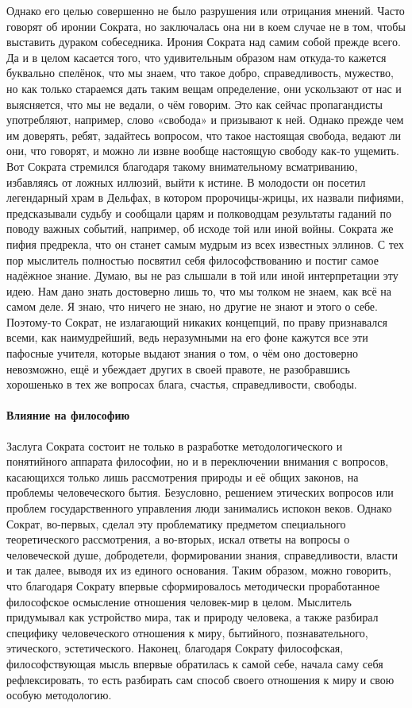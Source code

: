 Однако его целью совершенно не было разрушения или отрицания мнений. Часто говорят об иронии Сократа, но заключалась она ни в коем случае не в том, чтобы выставить дураком собеседника. Ирония Сократа над самим собой прежде всего. Да и в целом касается того, что удивительным образом нам откуда-то кажется буквально спелёнок, что мы знаем, что
такое добро, справедливость, мужество, но как только стараемся дать таким вещам
определение, они ускользают от нас и выясняется, что мы не ведали, о чём
говорим. Это как сейчас пропагандисты употребляют, например, слово «свобода» и
призывают к ней. Однако прежде чем им доверять, ребят, задайтесь вопросом, что
такое настоящая свобода, ведают ли они, что говорят, и можно ли извне вообще
настоящую свободу как-то ущемить. Вот Сократа стремился благодаря такому
внимательному всматриванию, избавляясь от ложных иллюзий, выйти к истине. В
молодости он посетил легендарный храм в Дельфах, в котором пророчицы-жрицы, их
назвали пифиями, предсказывали судьбу и сообщали царям и полководцам результаты
гаданий по поводу важных событий, например, об исходе той или иной войны.
Сократа же пифия предрекла, что он станет самым мудрым из всех известных
эллинов. С тех пор мыслитель полностью посвятил себя философствованию и постиг
самое надёжное знание. Думаю, вы не раз слышали в той или иной интерпретации эту
идею. Нам дано знать достоверно лишь то, что мы толком не знаем, как всё на
самом деле. Я знаю, что ничего не знаю, но другие не знают и этого о себе.
Поэтому-то Сократ, не излагающий никаких концепций, по праву признавался всеми,
как наимудрейший, ведь неразумными на его фоне кажутся все эти пафосные учителя,
которые выдают знания о том, о чём оно достоверно невозможно, ещё и убеждает
других в своей правоте, не разобравшись хорошенько в тех же вопросах блага,
счастья, справедливости, свободы. 

\paragraph{Влияние на философию}

Заслуга Сократа состоит не только в разработке методологического и понятийного аппарата философии, но и в переключении внимания с вопросов, касающихся только лишь рассмотрения природы и её общих законов, на проблемы человеческого бытия. Безусловно, решением этических вопросов или проблем государственного управления люди занимались испокон веков. 
Однако Сократ, во-первых, сделал эту проблематику предметом специального теоретического рассмотрения, а во-вторых, искал ответы на вопросы о человеческой душе, добродетели, формировании знания, справедливости, власти и так далее,
выводя их из единого основания. Таким образом, можно говорить, что благодаря
Сократу впервые сформировалось методически проработанное философское осмысление
отношения человек-мир в целом. Мыслитель придумывал как устройство мира, так и
природу человека, а также разбирал специфику человеческого отношения к миру,
бытийного, познавательного, этического, эстетического. Наконец, благодаря
Сократу философская, философствующая мысль впервые обратилась к самой себе,
начала саму себя рефлексировать, то есть разбирать сам способ своего отношения к
миру и свою особую методологию. 

